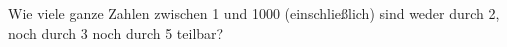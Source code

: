 \begin{aufgabe}
Wie viele ganze Zahlen zwischen 1 und 1000 (einschließlich) sind weder durch 2, noch durch 3 noch durch 5 teilbar?
\end{aufgabe}
